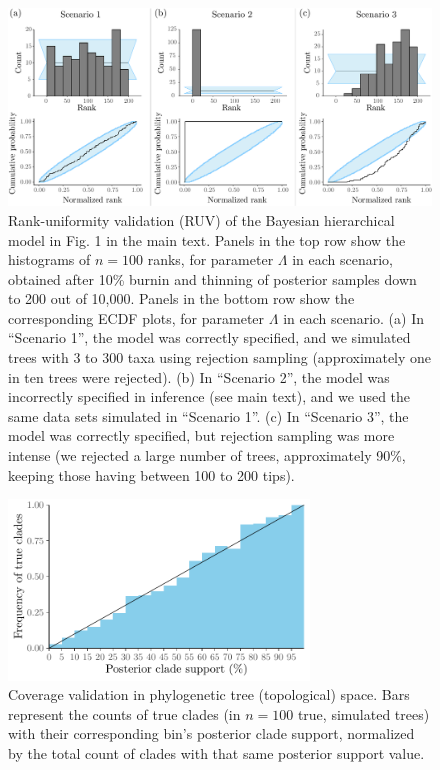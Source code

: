 \documentclass[oneside]{article}
\begin{document}
\begin{figure}[!ht]
   \includegraphics[width=\linewidth]{../figures/sbc_Yule_lambda_manual.pdf}
  \caption{Rank-uniformity validation (RUV) of the Bayesian hierarchical model in Fig. 1 in the main text.
    Panels in the top row show the histograms of $n=100$ ranks, for parameter $\Lambda$ in each scenario, obtained after 10\% burnin and thinning of posterior samples down to 200 out of 10,000.
    Panels in the bottom row show the corresponding ECDF plots, for parameter $\Lambda$ in each scenario.
    (a) In ``Scenario 1'', the model was correctly specified, and we simulated trees with 3 to 300 taxa using rejection sampling (approximately one in ten trees were rejected).
    (b) In ``Scenario 2'', the model was incorrectly specified in inference (see main text), and we used the same data sets simulated in ``Scenario 1''.
    (c) In ``Scenario 3'', the model was correctly specified, but rejection sampling was more intense (we rejected a large number of trees, approximately 90\%, keeping those having between 100 to 200 tips).
   }
  \label{supfig:ruv_yule_lambda}
\end{figure}

\begin{figure}[!ht]
  \centering
   \includegraphics[width=8cm]{../figures/clade_coverage.pdf}
   \caption{Coverage validation in phylogenetic tree (topological) space. Bars represent the counts of true clades (in $n=100$ true, simulated trees) with their corresponding bin's posterior clade support, normalized by the total count of clades with that same posterior support value.}
   \label{supfig:clade_covg}
\end{figure}
 
\end{document}
